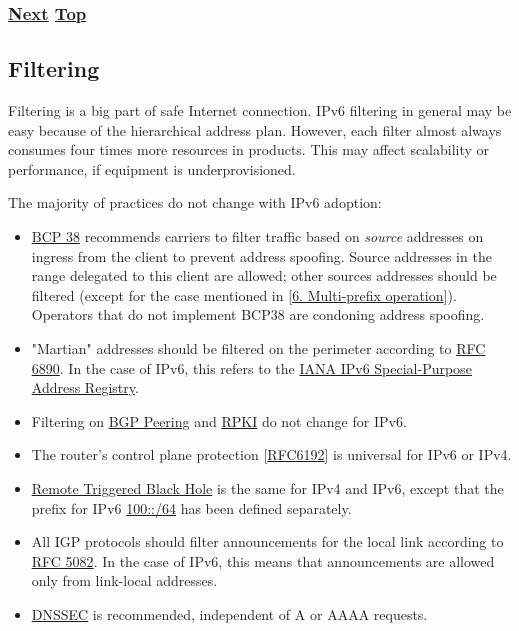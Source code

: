\documentclass[
]{article}
\providecommand{\tightlist}{%
  \setlength{\itemsep}{0pt}\setlength{\parskip}{0pt}}
\begin{document}
\subsubsection{\texorpdfstring{\hyperref[filtering]{Next}
\hyperref[security]{Top}}{Next Top}}\label{next-top-3}

\pagebreak

\subsection{Filtering}\label{filtering}

Filtering is a big part of safe Internet connection. IPv6 filtering in
general may be easy because of the hierarchical address plan. However,
each filter almost always consumes four times more resources in
products. This may affect scalability or performance, if equipment is
underprovisioned.

The majority of practices do not change with IPv6 adoption:

\begin{itemize}
\tightlist
\item
  \href{https://www.rfc-editor.org/info/bcp38}{BCP 38} recommends
  carriers to filter traffic based on \emph{source} addresses on ingress
  from the client to prevent address spoofing. Source addresses in the
  range delegated to this client are allowed; other sources addresses
  should be filtered (except for the case mentioned in
  {[}\hyperref[multi-prefix-operation]{6. Multi-prefix operation}{]}).
  Operators that do not implement BCP38 are condoning address spoofing.
\item
  "Martian" addresses should be filtered on the perimeter according to
  \href{https://www.rfc-editor.org/info/rfc6890}{RFC 6890}. In the case
  of IPv6, this refers to the
  \href{https://www.iana.org/assignments/iana-ipv6-special-registry/iana-ipv6-special-registry.xhtml}{IANA
  IPv6 Special-Purpose Address Registry}.
\item
  Filtering on \href{https://www.rfc-editor.org/info/rfc7454}{BGP
  Peering} and \href{https://www.rfc-editor.org/info/rfc8210}{RPKI} do
  not change for IPv6.
\item
  The router's control plane protection
  {[}\href{https://www.rfc-editor.org/info/rfc6192}{RFC6192}{]} is
  universal for IPv6 or IPv4.
\item
  \href{https://www.rfc-editor.org/info/rfc5635}{Remote Triggered Black
  Hole} is the same for IPv4 and IPv6, except that the prefix for IPv6
  \href{https://www.rfc-editor.org/info/rfc6666}{100::/64} has been
  defined separately.
\item
  All IGP protocols should filter announcements for the local link
  according to \href{https://www.rfc-editor.org/info/rfc5082}{RFC 5082}.
  In the case of IPv6, this means that announcements are allowed only
  from link-local addresses.
\item
  \href{https://www.rfc-editor.org/info/rfc4641}{DNSSEC} is recommended,
  independent of A or AAAA requests.
\end{itemize}
\end{document}
